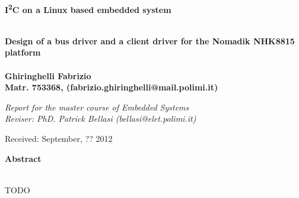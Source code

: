 \documentclass[a4paper,10pt]{article}
\newenvironment*{mytitle}{\begin{LARGE}\bf}{\end{LARGE}\\}%
\newenvironment*{mysubtitle}{\bf}{\\[1.5ex]}%
\newenvironment*{myabstract}{\begin{Large}\bf}{\end{Large}\\[2.5ex]}%
\newcommand{\icc}{I\textsuperscript{2}C }
\begin{document}
\begin{mytitle}\icc on a Linux based embedded system\end{mytitle}
\begin{mysubtitle}
Design of a bus driver and a client driver for the Nomadik NHK8815 platform
\end{mysubtitle}
%
%
\\
Ghiringhelli Fabrizio\\
Matr. 753368, (fabrizio.ghiringhelli@mail.polimi.it)\\
\hspace{10ex}
\begin{flushright}
\emph{Report for the master course of Embedded Systems}\\
\emph{Reviser: PhD. Patrick Bellasi (bellasi@elet.polimi.it)}
\end{flushright}

Received: September, ?? 2012\\
\hspace{10ex}

\begin{myabstract} Abstract \end{myabstract}
TODO
\end{document}
